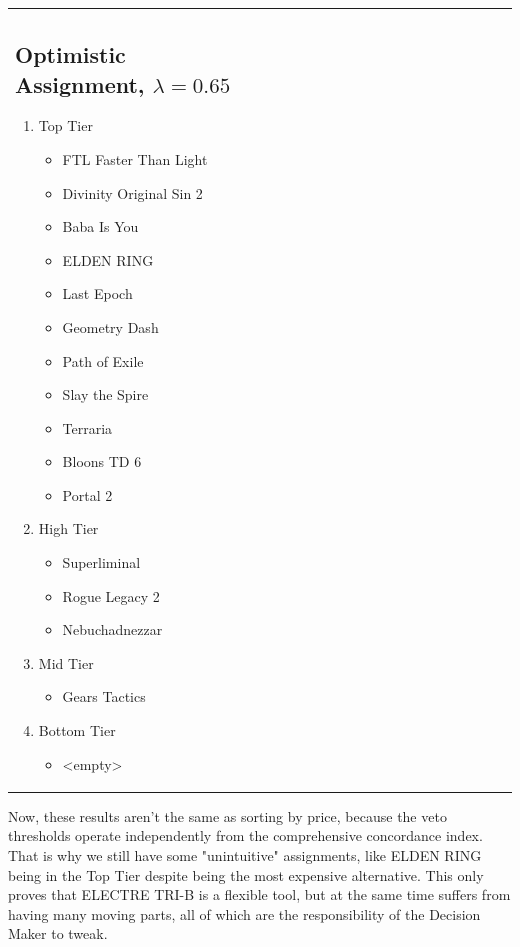 \documentclass{article}
\begin{document}
\begin{enumerate}
\begin{tabular}{m{0.5\linewidth}m{0.5\linewidth}}
    \subsection*{Optimistic Assignment, $\lambda = 0.65$}
    \begin{enumerate}
        \item Top Tier
            \begin{itemize}
                \item FTL Faster Than Light
                \item Divinity Original Sin 2
                \item Baba Is You
                \item ELDEN RING
                \item Last Epoch
                \item Geometry Dash
                \item Path of Exile
                \item Slay the Spire
                \item Terraria
                \item Bloons TD 6
                \item Portal 2
            \end{itemize}
        \item High Tier
            \begin{itemize}
                \item Superliminal
                \item Rogue Legacy 2
                \item Nebuchadnezzar
            \end{itemize}
        \item Mid Tier
            \begin{itemize}
                \item Gears Tactics
            \end{itemize}
        \item Bottom Tier
            \begin{itemize}
                \item <empty>
            \end{itemize}
    \end{enumerate}
\end{tabular}

Now, these results aren't the same as sorting by price, because the veto
thresholds operate independently from the comprehensive concordance index. That
is why we still have some "unintuitive" assignments, like ELDEN RING being in
the Top Tier despite being the most expensive alternative. This only proves that ELECTRE TRI-B is a flexible tool, but at the same time
suffers from having many moving parts, all of which are the responsibility of
the Decision Maker to tweak.

\end{enumerate}
\end{document}
